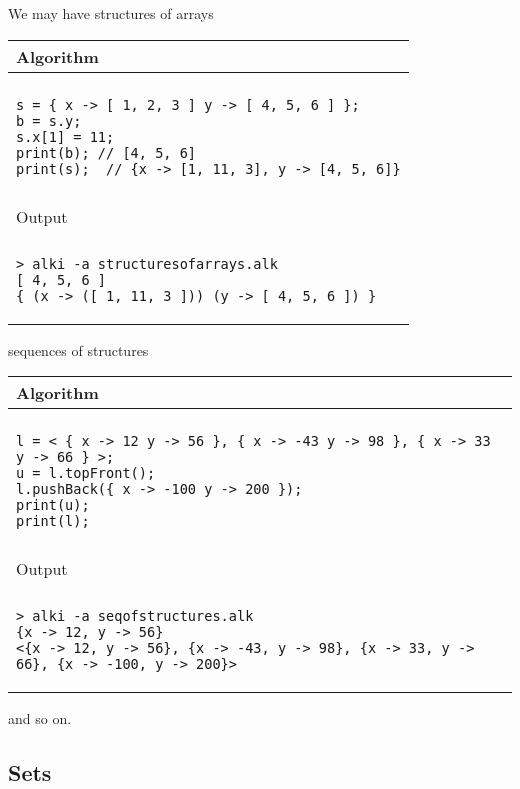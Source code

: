 \documentclass[a4paper]{report}
\begin{document}
We may have structures of arrays
\begin{center}
\begin{tabular}{l}
Algorithm\\
\hline
\\
\begin{minipage}{.65\textwidth}
\begin{verbatim}
s = { x -> [ 1, 2, 3 ] y -> [ 4, 5, 6 ] }; 
b = s.y;
s.x[1] = 11;
print(b); // [4, 5, 6]
print(s);  // {x -> [1, 11, 3], y -> [4, 5, 6]}
\end{verbatim}
\end{minipage}
\\
\\
Output\\
\hline
\\
\begin{minipage}{.65\textwidth}
\begin{verbatim}
> alki -a structuresofarrays.alk
[ 4, 5, 6 ]
{ (x -> ([ 1, 11, 3 ])) (y -> [ 4, 5, 6 ]) }
\end{verbatim}
\end{minipage}
\end{tabular}
\end{center}
sequences of structures
\begin{center}
\begin{tabular}{l}
Algorithm \\
\hline
\\
\begin{minipage}{.85\textwidth}
\begin{verbatim}
l = < { x -> 12 y -> 56 }, { x -> -43 y -> 98 }, { x -> 33 y -> 66 } >; 
u = l.topFront();
l.pushBack({ x -> -100 y -> 200 });
print(u);
print(l); 
\end{verbatim}
\end{minipage}
\\
\\
Output\\
\hline
\\
\begin{minipage}{.85\textwidth}
\begin{verbatim}
> alki -a seqofstructures.alk
{x -> 12, y -> 56}
<{x -> 12, y -> 56}, {x -> -43, y -> 98}, {x -> 33, y -> 66}, {x -> -100, y -> 200}>
\end{verbatim}
\end{minipage}
\end{tabular}
\end{center}
and so on.


\subsection{Sets}
\end{document}
